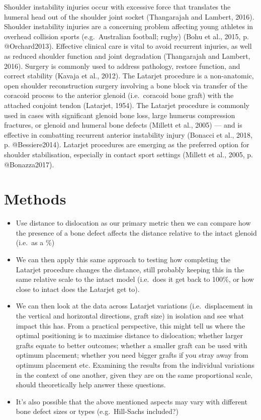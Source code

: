 \documentclass[]{elsarticle} %
\providecommand{\tightlist}{%
  \setlength{\itemsep}{0pt}\setlength{\parskip}{0pt}}
\begin{document}
Shoulder instability injuries occur with excessive force that translates
the humeral head out of the shoulder joint socket (Thangarajah and
Lambert, 2016). Shoulder instability injuries are a concerning problem
affecting young athletes in overhead collision sports (e.g.~Australian
football; rugby) (Bohu et al., 2015, p. @Orchard2013). Effective
clinical care is vital to avoid recurrent injuries, as well as reduced
shoulder function and joint degradation (Thangarajah and Lambert, 2016).
Surgery is commonly used to address pathology, restore function, and
correct stability (Kavaja et al., 2012). The Latarjet procedure is a
non-anatomic, open shoulder reconstruction surgery involving a bone
block via transfer of the coracoid process to the anterior glenoid
(i.e.~coracoid bone graft) with the attached conjoint tendon (Latarjet,
1954). The Latarjet procedure is commonly used in cases with significant
glenoid bone loss, large humerus compression fractures, or glenoid and
humeral bone defects (Millett et al., 2005) --- and is effective in
combatting recurrent anterior instability injury (Bonacci et al., 2018,
p. @Bessiere2014). Latarjet procedures are emerging as the preferred
option for shoulder stabilisation, especially in contact sport settings
(Millett et al., 2005, p. @Bonazza2017).

\hypertarget{methods}{%
\section{Methods}\label{methods}}

\begin{itemize}
\tightlist
\item
  Use distance to dislocation as our primary metric then we can compare
  how the presence of a bone defect affects the distance relative to the
  intact glenoid (i.e.~as a \%)
\item
  We can then apply this same approach to testing how completing the
  Latarjet procedure changes the distance, still probably keeping this
  in the same relative scale to the intact model (i.e.~does it get back
  to 100\%, or how close to intact does the Latarjet get to).
\item
  We can then look at the data across Latarjet variations
  (i.e.~displacement in the vertical and horizontal directions, graft
  size) in isolation and see what impact this has. From a practical
  perspective, this might tell us where the optimal positioning is to
  maximise distance to dislocation; whether larger grafts equate to
  better outcomes; whether a smaller graft can be used with optimum
  placement; whether you need bigger grafts if you stray away from
  optimum placement etc. Examining the results from the individual
  variations in the context of one another, given they are on the same
  proportional scale, should theoretically help answer these questions.
\item
  It's also possible that the above mentioned aspects may vary with
  different bone defect sizes or types (e.g.~Hill-Sachs included?)
\end{itemize}
\end{document}
